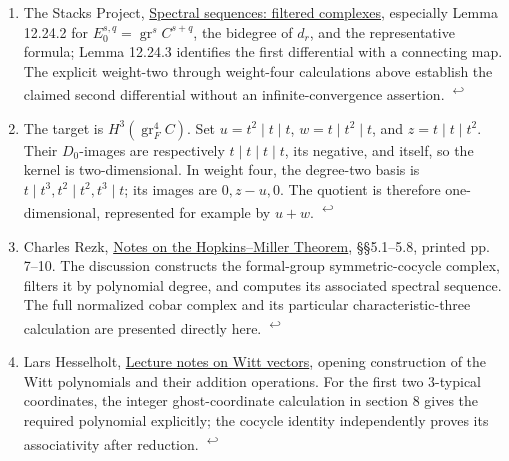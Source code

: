 \documentclass[11pt,letterpaper]{article}
\begin{document}
\begingroup\small
\begin{enumerate}[leftmargin=1.8em,label=\arabic*.,itemsep=.8em]
\item \hypertarget{note-filtered-complex}{}The Stacks Project, \href{https://stacks.math.columbia.edu/tag/012K}{Spectral sequences: filtered complexes}, especially Lemma 12.24.2 for \(
E_0^{s,q}=\operatorname{gr}^s C^{s+q}
\), the bidegree of \(
d_r
\), and the representative formula; Lemma 12.24.3 identifies the first differential with a connecting map. The explicit weight-two through weight-four calculations above establish the claimed second differential without an infinite-convergence assertion. \hyperlink{citation-filtered-complex-1}{\textsuperscript{\(\hookleftarrow\)}}
\item \hypertarget{note-outgoing-target}{}The target is \(
H^3(\operatorname{gr}_F^4C)
\). Set \(
u=t^2\mid t\mid t
\), \(
w=t\mid t^2\mid t
\), and \(
z=t\mid t\mid t^2
\). Their \(
D_0
\)-images are respectively \(
t\mid t\mid t\mid t
\), its negative, and itself, so the kernel is two-dimensional. In weight four, the degree-two basis is \(
t\mid t^3,t^2\mid t^2,t^3\mid t
\); its images are \(
0,z-u,0
\). The quotient is therefore one-dimensional, represented for example by \(
u+w
\). \hyperlink{citation-outgoing-target-1}{\textsuperscript{\(\hookleftarrow\)}}
\item \hypertarget{note-rezk}{}Charles Rezk, \href{https://www.sas.rochester.edu/mth/sites/doug-ravenel/otherpapers/hopkins-miller-thm.pdf}{Notes on the Hopkins–Miller Theorem}, §§5.1–5.8, printed pp. 7–10. The discussion constructs the formal-group symmetric-cocycle complex, filters it by polynomial degree, and computes its associated spectral sequence. The full normalized cobar complex and its particular characteristic-three calculation are presented directly here. \hyperlink{citation-rezk-1}{\textsuperscript{\(\hookleftarrow\)}}
\item \hypertarget{note-witt}{}Lars Hesselholt, \href{https://math.mit.edu/~larsh/papers/s03/wittsurvey.pdf}{Lecture notes on Witt vectors}, opening construction of the Witt polynomials and their addition operations. For the first two \(
3
\)-typical coordinates, the integer ghost-coordinate calculation in section 8 gives the required polynomial explicitly; the cocycle identity independently proves its associativity after reduction. \hyperlink{citation-witt-1}{\textsuperscript{\(\hookleftarrow\)}}
\end{enumerate}
\endgroup
\end{document}
